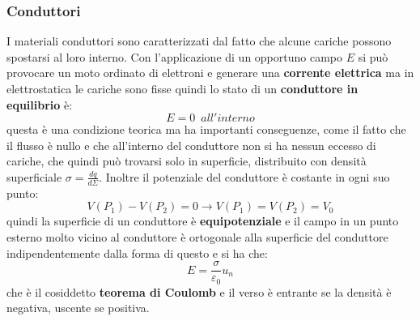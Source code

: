 \documentclass[a4paper,12pt, oneside]{book}
\begin{document}
\subsubsection{Conduttori}
I materiali conduttori sono caratterizzati dal fatto che alcune cariche possono spostarsi al loro interno. Con l'applicazione di un opportuno campo $E$ si può provocare un moto ordinato di elettroni e generare una \textbf{corrente elettrica} ma in elettrostatica le cariche sono fisse quindi lo stato di un \textbf{conduttore in equilibrio} è:
$$E=0\,\,\,all'interno$$
questa è una condizione teorica ma ha importanti conseguenze, come il fatto che il flusso è nullo e che all'interno del conduttore non si ha nessun eccesso di cariche, che quindi può trovarsi solo in superficie, distribuito con densità superficiale $\sigma=\frac{dq}{d\Sigma}$. Inoltre il potenziale del conduttore è costante in ogni suo punto:
$$V(P_1)-V(P_2)=0\longrightarrow V(P_1)=V(P_2)=V_0$$
quindi la superficie di un conduttore è \textbf{equipotenziale} e il campo in un punto esterno molto vicino al conduttore è ortogonale alla superficie del conduttore indipendentemente dalla forma di questo e si ha che:
$$E=\frac{\sigma}{\varepsilon_0}u_n$$
che è il cosiddetto \textbf{teorema di Coulomb} e il verso è entrante se la densità è negativa, uscente se positiva.
\end{document}
